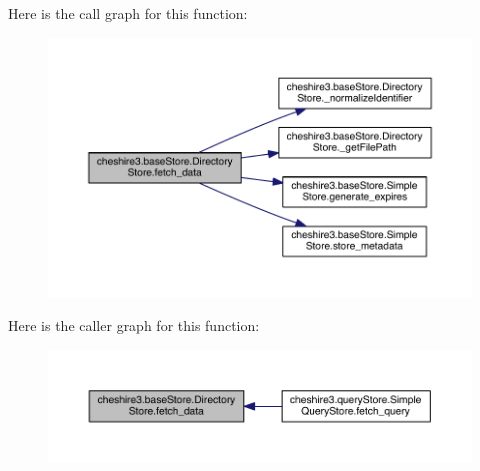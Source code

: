 Here is the call graph for this function\-:
\nopagebreak
\begin{figure}[H]
\begin{center}
\leavevmode
\includegraphics[width=350pt]{classcheshire3_1_1base_store_1_1_directory_store_aa6cdba97d37eea50db2d58a686336f18_cgraph}
\end{center}
\end{figure}




Here is the caller graph for this function\-:
\nopagebreak
\begin{figure}[H]
\begin{center}
\leavevmode
\includegraphics[width=350pt]{classcheshire3_1_1base_store_1_1_directory_store_aa6cdba97d37eea50db2d58a686336f18_icgraph}
\end{center}
\end{figure}


